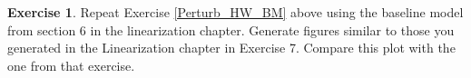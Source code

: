 \documentclass[letterpaper,12pt]{article}
\theoremstyle{definition}
\newtheorem{exercise}[theorem]{Exercise}
\begin{document}
\begin{spacing}{1.5}
	\begin{exercise} \label{Perturb_HW_BAse}
		Repeat Exercise \ref{Perturb_HW_BM} above using the baseline model from section 6 in the linearization chapter.  Generate figures similar to those you generated in the Linearization chapter in Exercise 7.  Compare this plot with the one from that exercise.
	\end{exercise}


\end{spacing}

\newpage


\end{document}
